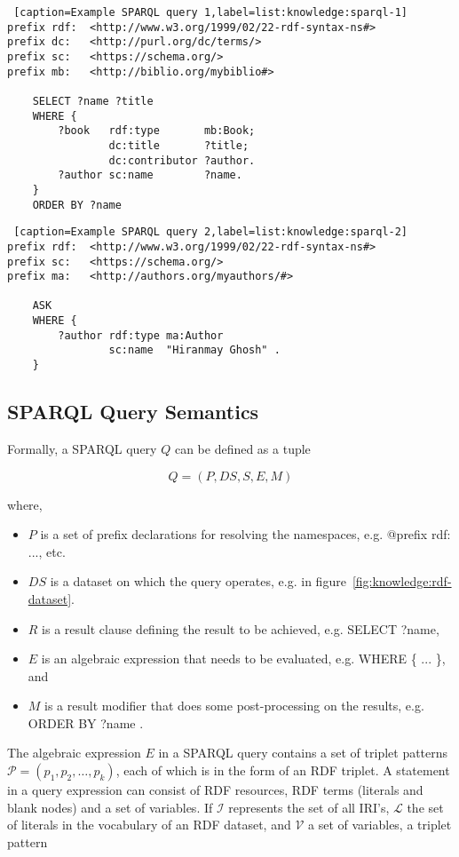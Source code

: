 \begin{lstlisting} [caption=Example SPARQL query 1,label=list:knowledge:sparql-1]
prefix rdf:  <http://www.w3.org/1999/02/22-rdf-syntax-ns#> 
prefix dc:   <http://purl.org/dc/terms/> 
prefix sc:   <https://schema.org/> 
prefix mb:   <http://biblio.org/mybiblio#> 
	
    SELECT ?name ?title
    WHERE { 
        ?book   rdf:type       mb:Book;
                dc:title       ?title;
                dc:contributor ?author.
        ?author sc:name        ?name. 
    }
    ORDER BY ?name 
\end{lstlisting}

\begin{lstlisting} [caption=Example SPARQL query 2,label=list:knowledge:sparql-2]
prefix rdf:  <http://www.w3.org/1999/02/22-rdf-syntax-ns#> 
prefix sc:   <https://schema.org/> 
prefix ma:   <http://authors.org/myauthors/#>

    ASK 
    WHERE { 
        ?author rdf:type ma:Author
                sc:name  "Hiranmay Ghosh" . 
    }
\end{lstlisting}


\subsection{SPARQL Query Semantics}

\noindent
Formally, a SPARQL query $Q$ can be defined as a tuple

\begin{equation}
	Q = (P, DS, S, E, M)
\end{equation}

\noindent
where, 
\begin{itemize}
	\item $P$ is a set of prefix declarations for resolving the namespaces, e.g. @prefix rdf: ..., etc. 
	\item $DS$ is a dataset on which the query operates, e.g. in figure~\ref{fig:knowledge:rdf-dataset}.
	\item $R$ is a result clause defining the result to be achieved, e.g. SELECT ?name,
	\item $E$ is an algebraic expression that needs to be evaluated, e.g. WHERE \{ ... \}, and
	\item $M$ is a result modifier that does some post-processing on the results, e.g. ORDER BY ?name .
\end{itemize}

\noindent
{}
The algebraic expression $E$ in a SPARQL query contains a set of triplet patterns $\mathcal{P} = (p_1, p_2, \dots, p_k)$, 
each of which is in the form of an RDF triplet. A statement in a query expression can consist of RDF resources, RDF terms (literals 
and blank nodes) and a set of variables. If $\mathcal{I}$ represents the set of all IRI's, $\mathcal{L}$ the set of literals in the 
vocabulary of an RDF dataset, and $\mathcal{V}$ a set of variables, a triplet pattern

